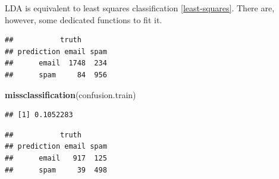 \documentclass[]{book}
\newenvironment{Shaded}{\begin{snugshade}}{\end{snugshade}}
\newcommand{\KeywordTok}[1]{\textcolor[rgb]{0.13,0.29,0.53}{\textbf{{#1}}}}
\newcommand{\DataTypeTok}[1]{\textcolor[rgb]{0.13,0.29,0.53}{{#1}}}
\newcommand{\FloatTok}[1]{\textcolor[rgb]{0.00,0.00,0.81}{{#1}}}
\newcommand{\StringTok}[1]{\textcolor[rgb]{0.31,0.60,0.02}{{#1}}}
\newcommand{\CommentTok}[1]{\textcolor[rgb]{0.56,0.35,0.01}{\textit{{#1}}}}
\newcommand{\NormalTok}[1]{{#1}}
\theoremstyle{definition}
\theoremstyle{definition}
\theoremstyle{remark}
\begin{document}
LDA is equivalent to least squares classification \ref{least-squares}.
There are, however, some dedicated functions to fit it.

\begin{Shaded}
\end{Shaded}

\begin{verbatim}
##           truth
## prediction email spam
##      email  1748  234
##      spam     84  956
\end{verbatim}

\begin{Shaded}
\begin{Highlighting}[]
\KeywordTok{missclassification}\NormalTok{(confusion.train)}
\end{Highlighting}
\end{Shaded}

\begin{verbatim}
## [1] 0.1052283
\end{verbatim}

\begin{Shaded}
\end{Shaded}

\begin{verbatim}
##           truth
## prediction email spam
##      email   917  125
##      spam     39  498
\end{verbatim}
\end{document}
